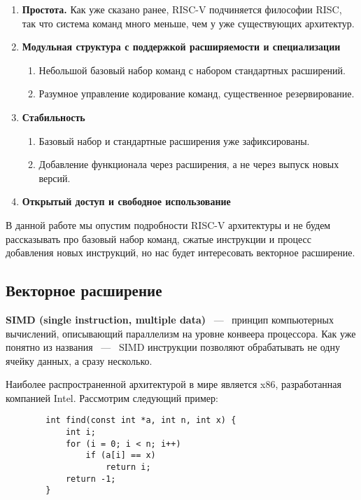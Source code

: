 \documentclass[a4paper, 12pt]{article}
\begin{document}
    \begin{enumerate}
        \item \textbf{Простота.} Как уже сказано ранее, RISC-V подчиняется философии RISC, так что
        система команд много меньше, чем у уже существующих архитектур.
        \item \textbf{Модульная структура с поддержкой расширяемости и специализации}
        \begin{enumerate}
            \item Небольшой базовый набор команд с набором стандартных расширений.
            \item Разумное управление кодирование команд, существенное резервирование.
        \end{enumerate}
        \item \textbf{Стабильность}
        \begin{enumerate}
            \item Базовый набор и стандартные расширения уже зафиксированы.
            \item Добавление функционала через расширения, а не через выпуск новых версий.
        \end{enumerate}
        \item \textbf{Открытый доступ и свободное использование}
    \end{enumerate}

    В данной работе мы опустим подробности RISC-V архитектуры и не будем рассказывать про базовый набор
    команд, сжатые инструкции и процесс добавления новых инструкций, но нас будет интересовать векторное
    расширение.

    \subsection{Векторное расширение}

    \textbf {SIMD (single instruction, multiple data)} ~---~ принцип компьютерных вычислений, описывающий
    параллелизм на уровне конвеера процессора. Как уже понятно из названия ~---~ SIMD инструкции позволяют
    обрабатывать не одну ячейку данных, а сразу несколько.

    Наиболее распространенной архитектурой в мире является x86, разработанная компанией Intel. Рассмотрим
    следующий пример:

    \begin{lstlisting}
        int find(const int *a, int n, int x) {
            int i;
            for (i = 0; i < n; i++)
                if (a[i] == x)
                    return i;
            return -1;
        }
    \end{lstlisting}
\end{document}
